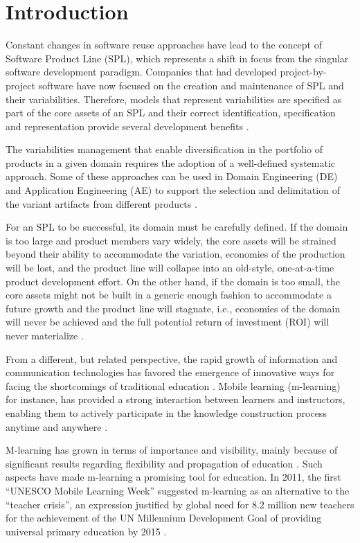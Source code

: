 \section{Introduction}

Constant changes in software reuse approaches have lead to the concept of Software Product Line (SPL), which represents a shift in focus from the singular software development paradigm. Companies that had developed project-by-project software have now focused on the creation and maintenance of SPL and their variabilities. Therefore, models that represent variabilities are specified as part of the core assets of an SPL and their correct identification, specification and representation provide several development benefits \cite{chen11,capilla13}.

The variabilities management that enable diversification in the portfolio of products in a given domain requires the adoption of a well-defined systematic approach. Some of these approaches can be used in Domain Engineering (DE) and Application Engineering (AE) to support the selection and delimitation of the variant artifacts from different products \cite{bockle05,vanderlinden07}.

For an SPL to be successful, its domain must be carefully defined. If the domain is too large and product members vary widely, the core assets will be strained beyond their ability to accommodate the variation, economies of the production will be lost, and the product line will collapse into an old-style, one-at-a-time product development effort. On the other hand, if the domain is too small, the core assets might not be built in a generic enough fashion to accommodate a future growth and the product line will stagnate, i.e., economies of the domain will never be achieved and the full potential return of investment (ROI) will never materialize \cite{bockle05,vanderlinden07}.

From a different, but related perspective, the rapid growth of information and communication technologies has favored the emergence of innovative ways for facing the shortcomings of traditional education \cite{west12}. Mobile learning (m-learning) for instance, has provided a strong interaction between learners and instructors, enabling them to actively participate in the knowledge construction process anytime and anywhere \cite{kukulska05}. 

M-learning has grown in terms of importance and visibility, mainly because of significant results regarding flexibility and propagation of education \cite{kinshuk03,wexler08}. Such aspects have made m-learning a promising tool for education. In 2011, the first ``UNESCO Mobile Learning Week'' suggested m-learning as an alternative to the ``teacher crisis'', an expression justified by global need for 8.2 million new teachers for the achievement of the UN Millennium Development Goal of providing universal primary education by 2015 \cite{west12}.

